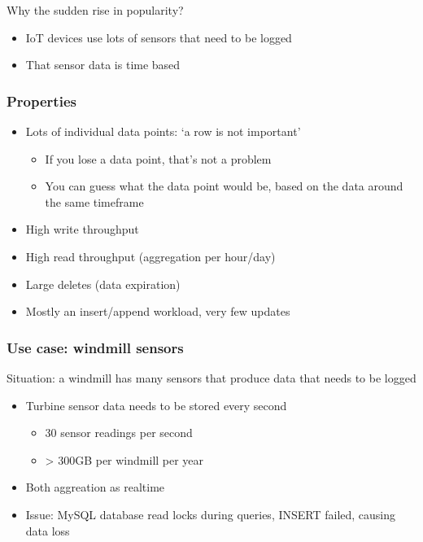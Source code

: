 \documentclass{article}
\begin{document}
Why the sudden rise in popularity?

\begin{itemize}
    \item IoT devices use lots of sensors that need to be logged
    \item That sensor data is time based
\end{itemize}

\subsubsection{Properties}

\begin{itemize}
    \item Lots of individual data points: `a row is not important'
    \begin{itemize}
        \item If you lose a data point, that's not a problem
        \item You can guess what the data point would be, based on the data around the same timeframe
    \end{itemize}
    \item High write throughput
    \item High read throughput (aggregation per hour/day)
    \item Large deletes (data expiration)
    \item Mostly an insert/append workload, very few updates
\end{itemize}

\subsubsection{Use case: windmill sensors}

Situation: a windmill has many sensors that produce data that needs to be logged

\begin{itemize}
    \item Turbine sensor data needs to be stored every second
    \begin{itemize}
        \item 30 sensor readings per second
        \item > 300GB per windmill per year
    \end{itemize}
    \item Both aggreation as realtime
    \item Issue: MySQL database read locks during queries, INSERT failed, causing data loss
\end{itemize}
\end{document}
